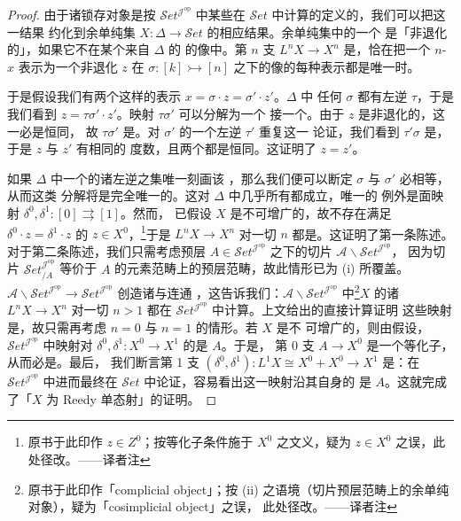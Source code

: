 \begin{proof}
由于诸锁存对象是按 $\mathcal{S}et^{\mathcal{J}^{\mathrm{op}}}$ 中某些在
$\mathcal{S}et$ 中\trPointwise{}计算的\trColimit{}定义的，我们可以把这一结果
约化到余单纯集 $X\colon\Delta\to\mathcal{S}et$ 的相应结果。余单纯集中的一个%
\trSimplex{}是「非退化的」，如果它不在某个来自 $\Delta$ 的\trMonomorphism{}%
的像中。第 $n$ 支\trLatchingMap{} $L^{n}X\to X^{n}$ 是\trMonomorphism，恰在把一个
$n$-\trSimplex{} $x$ 表示为一个非退化\trSimplex{} $z$ 在\trMonomorphism{}
$\sigma\colon[k]\rightarrowtail[n]$ 之下的像的每种表示都是唯一时。

于是假设我们有两个这样的表示 $x=\sigma\cdot z=\sigma'\cdot z'$。$\Delta$ 中
任何\trMonomorphism{} $\sigma$ 都有左逆 $\tau$，于是我们看到
$z=\tau\sigma'\cdot z'$。映射 $\tau\sigma'$ 可以分解为一个\trEpimorphism{}%
接一个\trMonomorphism。由于 $z$ 是非退化的，这一\trMonomorphism{}必是恒同，
故 $\tau\sigma'$ 是\trEpimorphism。对 $\sigma'$ 的一个左逆 $\tau'$ 重复这一
论证，我们看到 $\tau'\sigma$ 是\trEpimorphism，于是 $z$ 与 $z'$ 有相同的
度数，且两个\trEpimorphism{}都是恒同。这证明了 $z=z'$。

如果 $\Delta$ 中一个\trMonomorphism{}的诸左逆之集唯一刻画该%
\trMonomorphism，那么我们便可以断定 $\sigma$ 与 $\sigma'$ 必相等，从而这类
分解将是完全唯一的。这对 $\Delta$ 中几乎所有\trMonomorphism{}都成立，唯一的
例外是面映射 $\delta^{0},\delta^{1}\colon[0]\rightrightarrows[1]$。然而，
已假设 $X$ 是不可增广的，故不存在满足 $\delta^{0}\cdot z=\delta^{1}\cdot z$
的 $z\in X^{0}$，\footnote{原书于此印作 $z\in Z^{0}$；按等化子条件施于
$X^{0}$ 之文义，疑为 $z\in X^{0}$ 之误，此处径改。——译者注}于是
$L^{n}X\to X^{n}$ 对一切 $n$ 都是\trMonomorphism。这证明了第一条陈述。
对于第二条陈述，我们只需考虑预层 $A\in\mathcal{S}et^{\mathcal{J}^{\mathrm{op}}}$
之下的切片\trCategory{} $\mathcal{A}\backslash\mathcal{S}et^{\mathcal{J}^{\mathrm{op}}}$，
因为切片\trCategory{} $\mathcal{S}et^{\mathcal{J}^{\mathrm{op}}}_{/A}$ 等价于
$A$ 的元素范畴上的预层范畴，故此情形已为 (i) 所覆盖。\trForgetfulFunctor{}
$\mathcal{A}\backslash\mathcal{S}et^{\mathcal{J}^{\mathrm{op}}}\to\mathcal{S}et^{\mathcal{J}^{\mathrm{op}}}$
创造诸\trMonomorphism{}与连通%
\trColimit，这告诉我们：$\mathcal{A}\backslash\mathcal{S}et^{\mathcal{J}^{\mathrm{op}}}$
中\trCosimplicialObject{}\footnote{原书于此印作「complicial object」；按
(ii) 之语境（切片预层范畴上的余单纯对象），疑为「cosimplicial object」之误，
此处径改。——译者注}$X$ 的诸\trLatchingMap{} $L^{n}X\to X^{n}$ 对一切 $n>1$ 都在
$\mathcal{S}et^{\mathcal{J}^{\mathrm{op}}}$ 中计算。上文给出的直接计算证明
这些映射是\trMonomorphism，故只需再考虑 $n=0$ 与 $n=1$ 的情形。若 $X$ 是不
可增广的，则由假设，$\mathcal{S}et^{\mathcal{J}^{\mathrm{op}}}$ 中映射对
$\delta^{0},\delta^{1}\colon X^{0}\to X^{1}$ 的\trEqualizer{}是 $A$。于是，
第 0 支\trLatchingMap{} $A\to X^{0}$ 是一个等化子，从而必是\trMonomorphism。最后，
我们断言第 1 支\trLatchingMap{} $(\delta^{0},\delta^{1})\colon L^{1}X\cong X^{0}+X^{0}\to X^{1}$
是\trMonomorphism：在 $\mathcal{S}et^{\mathcal{J}^{\mathrm{op}}}$
中进而最终在 $\mathcal{S}et$ 中论证，容易看出这一映射沿其自身的\trPullback{}%
是 $A$。这就完成了「$X$ 为 Reedy 单态射」的证明。
\end{proof}

